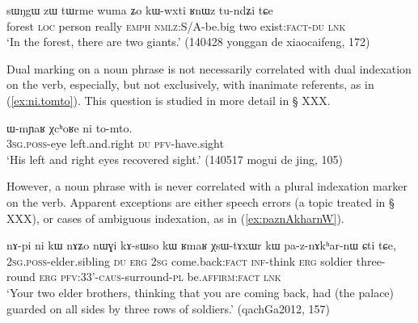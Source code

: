 \begin{exe}
\ex \label{ex:RnWz.tundZi}
\gll   sɯŋgɯ zɯ tɯrme wuma ʑo kɯ-wxti ʁnɯz tu-ndʑi tɕe\\
forest \textsc{loc} person really \textsc{emph} \textsc{nmlz}:S/A-be.big two exist:\textsc{fact}-\textsc{du} \textsc{lnk}\\
\glt `In the forest, there are two giants.'  (140428 yonggan de xiaocaifeng, 172)
\end{exe}

Dual marking on a noun phrase is not necessarily correlated with dual indexation on the verb, especially, but not exclusively, with inanimate referents, as in (\ref{ex:ni.tomto}). This question is studied in more detail in § XXX.

\begin{exe}
\ex \label{ex:ni.tomto}
\gll  ɯ-mɲaʁ χcʰoʁe ni to-mto. \\
\textsc{3sg}.\textsc{poss}-eye left.and.right \textsc{du} \textsc{pfv}-have.sight \\
\glt `His left and right eyes recovered sight.' (140517 mogui de jing, 105)
\end{exe}

However, a noun phrase with  is never correlated with a plural indexation marker on the verb. Apparent exceptions are either speech errors (a topic treated in § XXX), or cases of ambiguous indexation, as in (\ref{ex:paznAkharnW}).

\begin{exe}
\ex \label{ex:paznAkharnW}
 \gll  nɤ-pi ni kɯ nɤʑo nɯɣi kɤ-sɯso kɯ ʁmaʁ χsɯ-tɤxɯr kɯ pa-z-nɤkʰar-nɯ ɕti tɕe, \\
 \textsc{2sg}.\textsc{poss}-elder.sibling \textsc{du} \textsc{erg} \textsc{2sg} come.back:\textsc{fact} \textsc{inf}-think \textsc{erg} soldier three-round \textsc{erg} \textsc{pfv}:3\fl{}3'-\textsc{caus}-surround-\textsc{pl} be.\textsc{affirm}:\textsc{fact} \textsc{lnk} \\
 \glt `Your two elder brothers, thinking that you are coming back, had (the palace) guarded on all sides by three rows of soldiers.' (qachGa2012, 157)
\end{exe}

